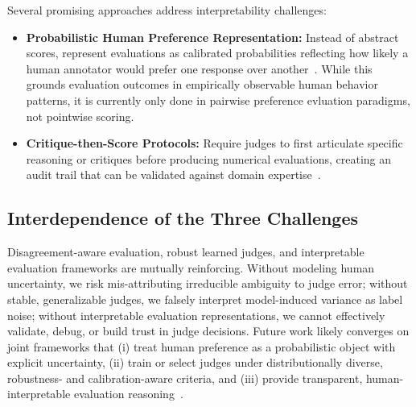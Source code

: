 Several promising approaches address interpretability challenges:
\begin{itemize}
	\item \textbf{Probabilistic Human Preference Representation:} Instead of abstract scores, represent evaluations as calibrated probabilities reflecting how likely a human annotator would prefer one response over another~\cite{stiennon2020learning, ouyang2022training}. While this grounds evaluation outcomes in empirically observable human behavior patterns, it is currently only done in pairwise preference evluation paradigms, not pointwise scoring.
	\item \textbf{Critique-then-Score Protocols:} Require judges to first articulate specific reasoning or critiques before producing numerical evaluations, creating an audit trail that can be validated against domain expertise~\cite{fu2023gptscore}.
\end{itemize}

\subsection{Interdependence of the Three Challenges}
Disagreement-aware evaluation, robust learned judges, and interpretable evaluation frameworks are mutually reinforcing. Without modeling human uncertainty, we risk mis-attributing irreducible ambiguity to judge error; without stable, generalizable judges, we falsely interpret model-induced variance as label noise; without interpretable evaluation representations, we cannot effectively validate, debug, or build trust in judge decisions. Future work likely converges on joint frameworks that (i) treat human preference as a probabilistic object with explicit uncertainty, (ii) train or select judges under distributionally diverse, robustness- and calibration-aware criteria, and (iii) provide transparent, human-interpretable evaluation reasoning~\cite{li2024_llmsasjudges, liang2022helm, bavaresco2024judgebench}.